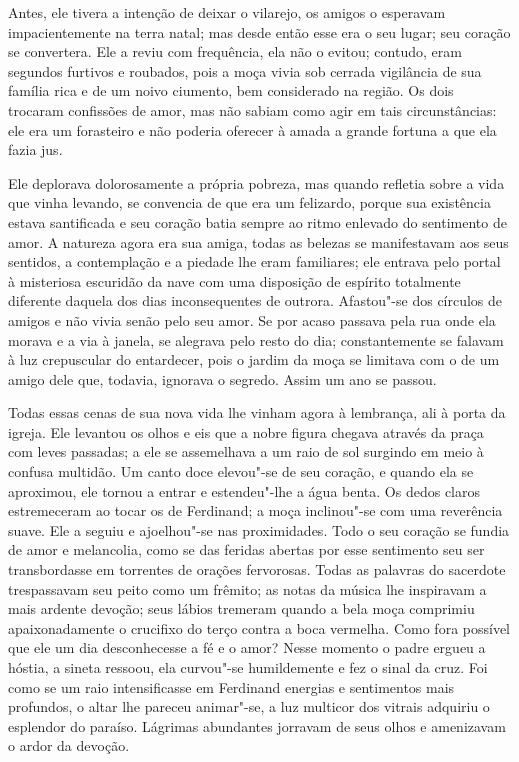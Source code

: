 Antes, ele tivera a intenção de deixar o vilarejo, os amigos o esperavam
impacientemente na terra natal; mas desde então esse era o seu
lugar; seu coração se convertera. Ele a reviu com frequência, ela não o
evitou; contudo, eram segundos furtivos e roubados, pois a moça vivia
sob cerrada vigilância de sua família rica e de um noivo ciumento, bem
considerado na região. Os dois trocaram confissões de amor, mas não
sabiam como agir em tais circunstâncias: ele era um forasteiro e não
poderia oferecer à amada a grande fortuna a que ela fazia jus. 
 
Ele deplorava dolorosamente a própria pobreza, mas quando refletia sobre
a vida que vinha levando, se convencia de que era um felizardo, porque
sua existência estava santificada e seu coração batia sempre ao ritmo
enlevado do sentimento de amor. A natureza agora era sua amiga, todas
as belezas se manifestavam aos seus sentidos, a contemplação e a
piedade lhe eram familiares; ele entrava pelo portal à misteriosa
escuridão da nave com uma disposição de espírito totalmente diferente
daquela dos dias inconsequentes de outrora. Afastou"-se dos círculos de
amigos e não vivia senão pelo seu amor. Se por acaso passava pela rua
onde ela morava e a via à janela, se alegrava pelo resto do dia;
constantemente se falavam à luz crepuscular do entardecer, pois o
jardim da moça se limitava com o de um amigo dele que, todavia,
ignorava o segredo. Assim um ano se passou.

Todas essas cenas de sua nova vida lhe vinham agora à lembrança, ali à
porta da igreja. Ele levantou os olhos e eis que a nobre figura chegava
através da praça com leves passadas; a ele se assemelhava a um raio de
sol surgindo em meio à confusa multidão. Um canto doce elevou"-se de seu
coração, e quando ela se aproximou, ele tornou a entrar e estendeu"-lhe
a água benta. Os dedos claros estremeceram ao tocar os de Ferdinand; a
moça inclinou"-se com uma reverência suave. Ele a seguiu e ajoelhou"-se
nas proximidades. Todo o seu coração se fundia de amor e melancolia,
como se das feridas abertas por esse sentimento seu ser transbordasse
em torrentes de orações fervorosas. Todas as palavras do sacerdote
trespassavam seu peito como um frêmito; as notas da música lhe
inspiravam a mais ardente devoção; seus lábios tremeram quando a bela
moça comprimiu apaixonadamente o crucifixo do terço contra a boca
vermelha. Como fora possível que ele um dia desconhecesse a fé e o
amor? Nesse momento o padre ergueu a hóstia, a sineta ressoou, ela
curvou"-se humildemente e fez o sinal da cruz. Foi como se um raio
intensificasse em Ferdinand energias e sentimentos mais profundos, o
altar lhe pareceu animar"-se, a luz multicor dos vitrais adquiriu o
esplendor do paraíso. Lágrimas abundantes jorravam de seus olhos e
amenizavam o ardor da devoção.

